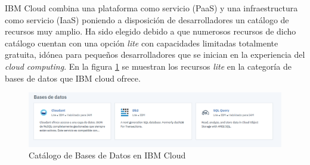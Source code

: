 IBM Cloud combina una plataforma como servicio (PaaS) y una infraestructura como servicio (IaaS) poniendo a disposición de desarrolladores un catálogo de recursos muy amplio. Ha sido elegido debido a que numerosos recursos de dicho catálogo cuentan con una opción \textit{lite} con capacidades limitadas totalmente gratuita, idónea para pequeños desarrolladores que se inician en la experiencia del \textit{cloud computing}. En la figura \ref{fig:catalogoIBM} se muestran los recursos \textit{lite} en la categoría de bases de datos que IBM cloud ofrece.
\begin{figure}[H]
            \centering
            \includegraphics[width=14cm]{figs/db_ibm.png}
            \caption{Catálogo de Bases de Datos en IBM Cloud}
            \label{fig:catalogoIBM}
\end{figure}
